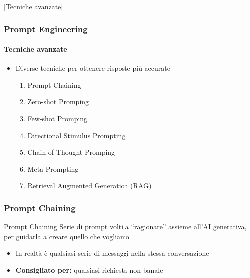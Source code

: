 [Tecniche avanzate]

\begin{contentframe}
    \frametitle{Prompt Engineering}
    \framesubtitle{Tecniche avanzate}

    \begin{itemize}
        \item Diverse tecniche per ottenere risposte più accurate

        \begin{enumerate}
            \item Prompt Chaining
            \item Zero-shot Promping
            \item Few-shot Promping
            \item Directional Stimulus Prompting
            \item Chain-of-Thought Promping
            \item Meta Prompting
            \item Retrieval Augmented Generation (RAG)
        \end{enumerate}
    \end{itemize}
\end{contentframe}

\begin{contentframe}
    \frametitle{Prompt Chaining}

    \begin{block}{Prompt Chaining}
        Serie di prompt volti a ``ragionare'' assieme all'AI generativa, per guidarla a creare quello che vogliamo
    \end{block}

    \begin{itemize}
        \item In realtà è qualsiasi serie di messaggi nella stessa conversazione

        \bigskip
        \item \textbf{Consigliato per:} qualsiasi richiesta non banale
    \end{itemize}
\end{contentframe}


